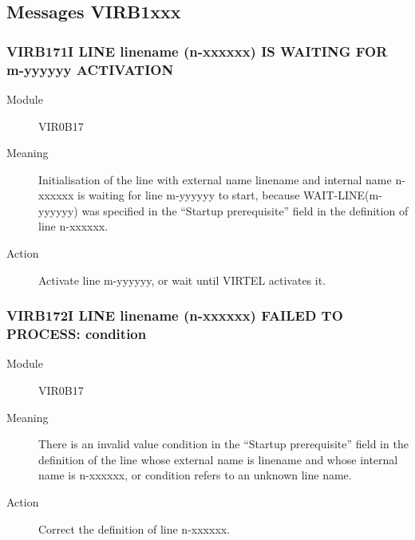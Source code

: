 \documentclass[letterpaper,10pt,english]{sphinxmanual}
\begin{document}
\subsection{Messages VIRB1xxx}
\label{\detokenize{messages:messages-virb1xxx}}

\subsubsection{VIRB171I LINE linename (n-xxxxxx) IS WAITING FOR m-yyyyyy ACTIVATION}
\label{\detokenize{messages:virb171i-line-linename-n-xxxxxx-is-waiting-for-m-yyyyyy-activation}}\begin{description}
\item[{Module}] \leavevmode
VIR0B17

\item[{Meaning}] \leavevmode
Initialisation of the line with external name linename and internal name n-xxxxxx is waiting for line m-yyyyyy to start, because WAIT-LINE(m-yyyyyy) was specified in the “Startup prerequisite” field in the definition of line n-xxxxxx.

\item[{Action}] \leavevmode
Activate line m-yyyyyy, or wait until VIRTEL activates it.

\end{description}


\subsubsection{VIRB172I LINE linename (n-xxxxxx) FAILED TO PROCESS: condition}
\label{\detokenize{messages:virb172i-line-linename-n-xxxxxx-failed-to-process-condition}}\begin{description}
\item[{Module}] \leavevmode
VIR0B17

\item[{Meaning}] \leavevmode
There is an invalid value condition in the “Startup prerequisite” field in the definition of the line whose external name is linename and whose internal name is n-xxxxxx, or condition refers to an unknown line name.

\item[{Action}] \leavevmode
Correct the definition of line n-xxxxxx.

\end{description}
\end{document}
